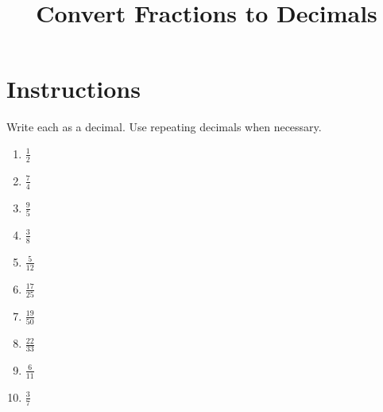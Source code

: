 \documentclass{article}
\begin{document}
\title{Convert Fractions to Decimals}
\author{}
\date{}
\maketitle

\section*{Instructions}
Write each as a decimal. Use repeating decimals when necessary.

\begin{enumerate}
    \item $\displaystyle \frac{1}{2}$
    \item $\displaystyle \frac{7}{4}$
    \item $\displaystyle \frac{9}{5}$
    \item $\displaystyle \frac{3}{8}$
    \item $\displaystyle \frac{5}{12}$
    \item $\displaystyle \frac{17}{25}$
    \item $\displaystyle \frac{19}{50}$
    \item $\displaystyle \frac{22}{33}$
    \item $\displaystyle \frac{6}{11}$
    \item $\displaystyle \frac{3}{7}$
\end{enumerate}
\end{document}
